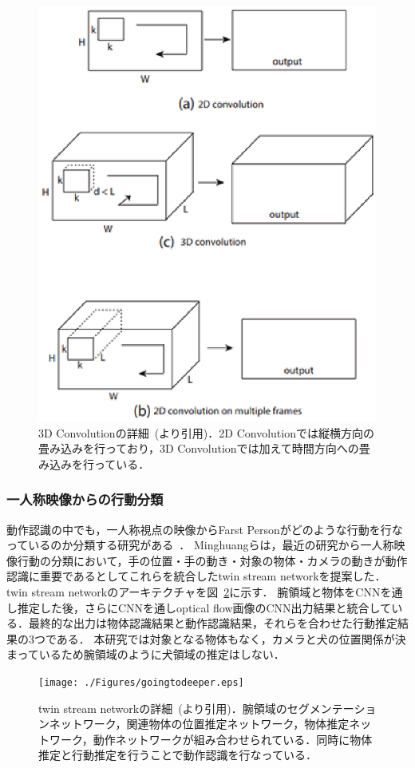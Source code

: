 \begin{figure}[htbp]
 \begin{center}
  \includegraphics[width=12cm]{./Figures/3dconv.eps}
  \caption{3D Convolutionの詳細~(\cite{tran14}より引用)．2D Convolutionでは縦横方向の畳み込みを行っており，3D Convolutionでは加えて時間方向への畳み込みを行っている．}
  \label{3dconv_image}
 \end{center}
\end{figure}


\subsubsection{一人称映像からの行動分類}
動作認識の中でも，一人称視点の映像からFarst Personがどのような行動を行なっているのか分類する研究がある~\cite{minghuang2016fpar}\cite{gedas2017dblp}．
Minghuangら\cite{minghuang2016fpar}は，最近の研究から一人称映像行動の分類において，手の位置・手の動き・対象の物体・カメラの動きが動作認識に重要であるとしてこれらを統合したtwin stream networkを提案した．
twin stream networkのアーキテクチャを図~\ref{twinst_image}に示す．
腕領域と物体をCNNを通し推定した後，さらにCNNを通しoptical flow画像のCNN出力結果と統合している．最終的な出力は物体認識結果と動作認識結果，それらを合わせた行動推定結果の3つである．
本研究では対象となる物体もなく，カメラと犬の位置関係が決まっているため腕領域のように犬領域の推定はしない．
\begin{figure}[htbp]
 \begin{center}
  \texttt{[image: ./Figures/goingtodeeper.eps]}
  \caption{twin stream networkの詳細~(\cite{minghuang2016fpar}より引用)．腕領域のセグメンテーションネットワーク，関連物体の位置推定ネットワーク，物体推定ネットワーク，動作ネットワークが組み合わせられている．同時に物体推定と行動推定を行うことで動作認識を行なっている．}
  \label{twinst_image}
 \end{center}
\end{figure}

